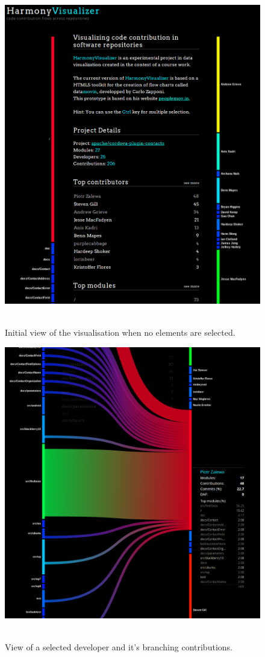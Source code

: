 \begin{figure}[H]
\centering
\includegraphics[width=1\textwidth]{./resources/visualiser_default.png}~
\caption{Initial view of the visualisation when no elements are selected.}
\label{fig:visualiser_default}
\end{figure}

\begin{figure}[H]
\centering
\includegraphics[width=1\textwidth]{./resources/visualiser_dev.png}~
\caption{View of a selected developer and it's branching contributions.}
\label{fig:visualiser_dev}
\end{figure}


